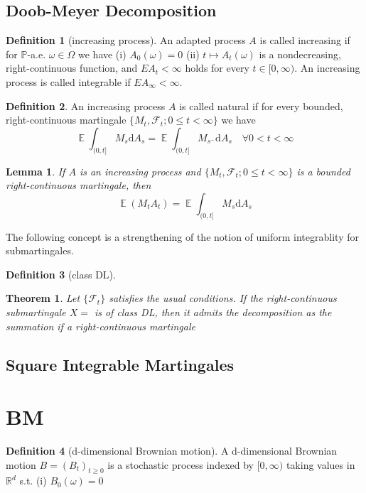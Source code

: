 \documentclass{article}
\newtheorem{Thm}{Theorem}[section]
\newtheorem{Lem}{Lemma}[section]
\theoremstyle{definition}
\newtheorem{Def}{Definition}[section]
\newcommand{\EE}{\operatorname{\mathbb{E}}}
\newcommand{\PP}{\mathbb{P}}
\renewcommand{\leq}{\leqslant}
\renewcommand{\geq}{\geqslant}
\newcommand{\<}{\left\langle}
\renewcommand{\>}{\right\rangle}
\begin{document}
\subsection{Doob-Meyer Decomposition}
\begin{Def}[increasing process]
    An adapted process $A$ is called increasing if for $\PP$-a.e. $\omega\in\Omega$ we have \newline 
    (i) $A_0(\omega)=0$\newline 
    (ii) $t\mapsto A_t(\omega)$ is a nondecreasing, right-continuous function, and $EA_t<\infty$ holds for every $t\in [0,\infty)$.\newline 
    An increasing process is called integrable if $EA_\infty<\infty$.
\end{Def}
\begin{Def}
    An increasing process $A$ is called natural if for every bounded, right-continuous martingale $\{M_t,\mathcal{F}_t;0\leq t<\infty\}$ we have
    \[ \EE\int_{(0,t]}M_s\mathrm{d}A_s=\EE\int_{(0,t]}M_{s^-}\mathrm{d}A_s\quad\forall 0<t<\infty\]
\end{Def}
\begin{Lem}
    If $A$ is an increasing process and $\{M_t,\mathcal{F}_t;0\leq t<\infty\}$ is a bounded right-continuous martingale, then 
    \[ \EE(M_tA_t)=\EE\int_{(0,t]}M_s\mathrm{d}A_s \]
\end{Lem}
The following concept is a strengthening of the notion of uniform integrablity for submartingales.
\begin{Def}[class DL]
    
\end{Def}
\begin{Thm}
    Let $\{\mathcal{F}_t\}$ satisfies the usual conditions. If the right-continuous submartingale $X=$ is of class DL,
    then it admits the decomposition as the summation if a right-continuous martingale
\end{Thm}

\subsection{Square Integrable Martingales}




\section{BM}
\begin{Def}[d-dimensional Brownian motion]
    A d-dimensional Brownian motion $B=(B_t)_{t\geq 0}$ is a stochastic process indexed by $[0,\infty)$ taking values in $\mathbb{R}^d$ s.t. \newline 
    (i) $B_0(\omega)=0$

\end{Def}
\end{document}
